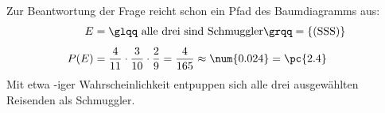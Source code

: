 \begin{exercise}
\begin{center}
    \end{center}
    Zur Beantwortung der Frage reicht schon ein
    Pfad des Baumdiagramms aus:
    \begin{equation*}
      \begin{split}
        E&=\text{\glqq alle drei sind Schmuggler\grqq}
        =\{(\text{SSS})\}
        \\[1ex]
        P(E)&=\frac{4}{11}\cdot\frac{3}{10}\cdot\frac{2}{9}
        =\frac{4}{165}
        \approx\num{0.024}
        =\pc{2.4}
      \end{split}
    \end{equation*}
    Mit etwa -iger Wahrscheinlichkeit entpuppen
    sich alle drei ausgewählten Reisenden als Schmuggler.
  \fi
\end{exercise}
